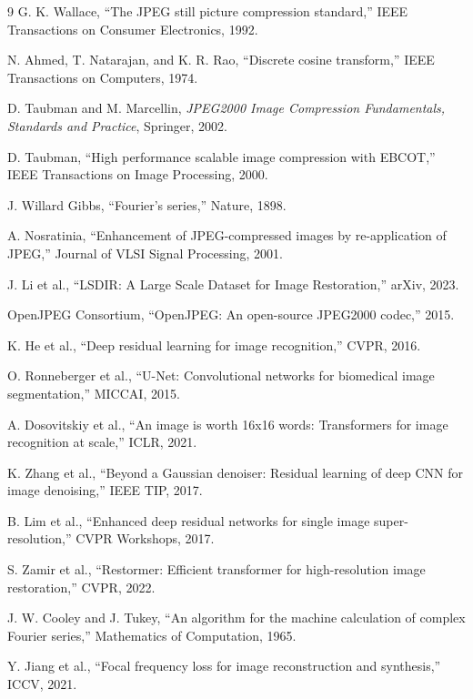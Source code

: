 \documentclass[12pt]{article}
\begin{document}
\renewcommand{\refname}{\selectfont References} %
\begin{thebibliography}{9}
\itemsep 0pt
G. K. Wallace, “The JPEG still picture compression standard,” IEEE Transactions on Consumer Electronics, 1992.

N. Ahmed, T. Natarajan, and K. R. Rao, “Discrete cosine transform,” IEEE Transactions on Computers, 1974.

D. Taubman and M. Marcellin, \textit{JPEG2000 Image Compression Fundamentals, Standards and Practice}, Springer, 2002.

D. Taubman, “High performance scalable image compression with EBCOT,” IEEE Transactions on Image Processing, 2000.

J. Willard Gibbs, “Fourier’s series,” Nature, 1898.

A. Nosratinia, “Enhancement of JPEG-compressed images by re-application of JPEG,” Journal of VLSI Signal Processing, 2001.

J. Li et al., “LSDIR: A Large Scale Dataset for Image Restoration,” arXiv, 2023.

OpenJPEG Consortium, “OpenJPEG: An open-source JPEG2000 codec,” 2015.

K. He et al., “Deep residual learning for image recognition,” CVPR, 2016.

O. Ronneberger et al., “U-Net: Convolutional networks for biomedical image segmentation,” MICCAI, 2015.

A. Dosovitskiy et al., “An image is worth 16x16 words: Transformers for image recognition at scale,” ICLR, 2021.

K. Zhang et al., “Beyond a Gaussian denoiser: Residual learning of deep CNN for image denoising,” IEEE TIP, 2017.

B. Lim et al., “Enhanced deep residual networks for single image super-resolution,” CVPR Workshops, 2017.

S. Zamir et al., “Restormer: Efficient transformer for high-resolution image restoration,” CVPR, 2022.

J. W. Cooley and J. Tukey, “An algorithm for the machine calculation of complex Fourier series,” Mathematics of Computation, 1965.

Y. Jiang et al., “Focal frequency loss for image reconstruction and synthesis,” ICCV, 2021.


\end{thebibliography}
\end{document}
